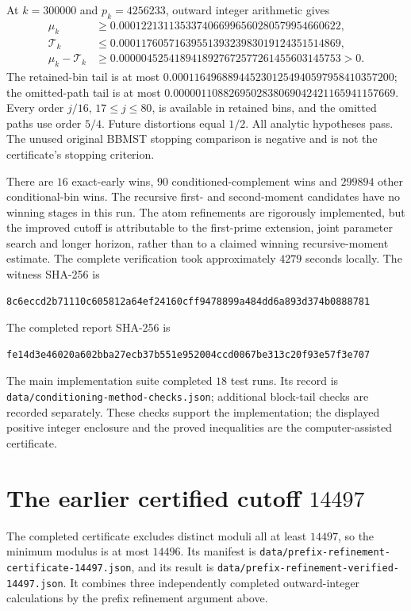 \documentclass[11pt]{article}
\begin{document}
At $k=300000$ and $p_k=4256233$, outward integer arithmetic gives
\begin{align*}
 \mu_k&\geq0.0001221311353374066996560280579954660622,\\
 \mathcal T_k&\leq0.0001176057163955139323983019124351514869,\\
 \mu_k-\mathcal T_k&\geq0.0000045254189418927672577261455603145753>0.
\end{align*}
The retained-bin tail is at most
$0.0001164968894452301254940597958410357200$; the omitted-path tail
is at most $0.0000011088269502838069042421165941157669$.
Every order $j/16$, $17\leq j\leq80$, is available in retained bins,
and the omitted paths use order $5/4$. Future distortions equal $1/2$.
All analytic hypotheses pass. The unused original BBMST stopping
comparison is negative and is not the certificate's stopping criterion.

There are $16$ exact-early wins, $90$ conditioned-complement wins and
$299894$ other conditional-bin wins. The recursive first- and second-moment
candidates have no winning stages in this run. The atom refinements are
rigorously implemented, but the improved cutoff is attributable to the
first-prime extension, joint parameter search and longer horizon, rather
than to a claimed winning recursive-moment estimate.
The complete verification took approximately $4279$ seconds locally.
The witness SHA-256 is
\begin{lstlisting}[basicstyle=\ttfamily\scriptsize,breaklines=true]
8c6eccd2b71110c605812a64ef24160cff9478899a484dd6a893d374b0888781
\end{lstlisting}
The completed report SHA-256 is
\begin{lstlisting}[basicstyle=\ttfamily\scriptsize,breaklines=true]
fe14d3e46020a602bba27ecb37b551e952004ccd0067be313c20f93e57f3e707
\end{lstlisting}
The main implementation suite completed $18$ test runs. Its record is
\texttt{data/conditioning-method-checks.json}; additional block-tail
checks are recorded separately. These checks support the implementation;
the displayed positive integer enclosure and the proved inequalities
are the computer-assisted certificate.

\section{The earlier certified cutoff $14497$}\label{sec:14497}
The completed certificate excludes distinct moduli all at least $14497$,
so the minimum modulus is at most $14496$. Its manifest is
\texttt{data/prefix-refinement-certificate-14497.json}, and its result is
\texttt{data/prefix-refinement-verified-14497.json}. It combines three
independently completed outward-integer calculations by the prefix
refinement argument above.
\end{document}
